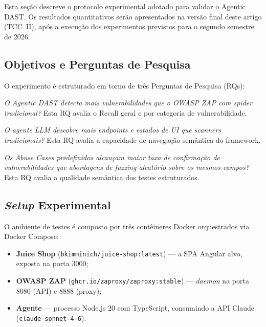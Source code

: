 \documentclass[
    10pt,
    twocolumn,
    a4paper
]{article}
\begin{document}
Esta seção descreve o protocolo experimental adotado para validar o
Agentic DAST. Os resultados quantitativos serão apresentados na versão
final deste artigo (TCC~II), após a execução dos experimentos previstos
para o segundo semestre de 2026.

\subsection{Objetivos e Perguntas de Pesquisa}

O experimento é estruturado em torno de três Perguntas de Pesquisa (RQs):

\begin{description}\setlength{\itemsep}{2pt}
  \item[\textbf{RQ1}] \textit{O Agentic DAST detecta mais
  vulnerabilidades que o OWASP ZAP com \textit{spider} tradicional?}
  Esta RQ avalia o Recall geral e por categoria de vulnerabilidade.

  \item[\textbf{RQ2}] \textit{O agente LLM descobre mais
  \textit{endpoints} e estados de UI que scanners tradicionais?}
  Esta RQ avalia a capacidade de navegação semântica do framework.

  \item[\textbf{RQ3}] \textit{Os \textit{Abuse Cases} predefinidos
  alcançam maior taxa de confirmação de vulnerabilidades que abordagens
  de \textit{fuzzing} aleatório sobre os mesmos campos?}
  Esta RQ avalia a qualidade semântica dos testes estruturados.
\end{description}

\subsection{\textit{Setup} Experimental}

O ambiente de testes é composto por três contêineres Docker
orquestrados via Docker Compose:

\begin{itemize}\setlength{\itemsep}{2pt}
  \item \textbf{Juice Shop} (\texttt{bkimminich/juice-shop:latest}) ---
  a SPA Angular alvo, exposta na porta 3000;
  \item \textbf{OWASP ZAP} (\texttt{ghcr.io/zaproxy/zaproxy:stable})
  --- \textit{daemon} na porta 8080 (API) e 8888 (proxy);
  \item \textbf{Agente} --- processo Node.js 20 com TypeScript,
  consumindo a API Claude (\texttt{claude-sonnet-4-6}).
\end{itemize}
\end{document}
